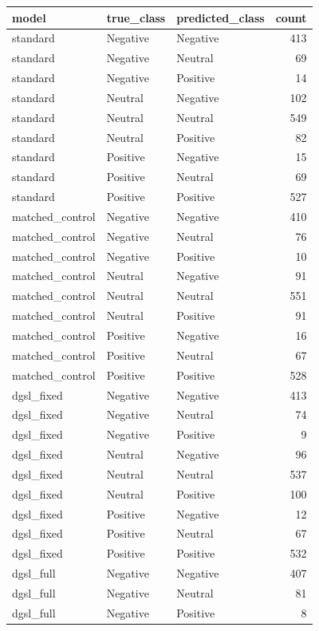 \begin{tabular}{lllr}
\toprule
model & true\_class & predicted\_class & count \\
\midrule
standard & Negative & Negative & 413 \\
standard & Negative & Neutral & 69 \\
standard & Negative & Positive & 14 \\
standard & Neutral & Negative & 102 \\
standard & Neutral & Neutral & 549 \\
standard & Neutral & Positive & 82 \\
standard & Positive & Negative & 15 \\
standard & Positive & Neutral & 69 \\
standard & Positive & Positive & 527 \\
matched\_control & Negative & Negative & 410 \\
matched\_control & Negative & Neutral & 76 \\
matched\_control & Negative & Positive & 10 \\
matched\_control & Neutral & Negative & 91 \\
matched\_control & Neutral & Neutral & 551 \\
matched\_control & Neutral & Positive & 91 \\
matched\_control & Positive & Negative & 16 \\
matched\_control & Positive & Neutral & 67 \\
matched\_control & Positive & Positive & 528 \\
dgsl\_fixed & Negative & Negative & 413 \\
dgsl\_fixed & Negative & Neutral & 74 \\
dgsl\_fixed & Negative & Positive & 9 \\
dgsl\_fixed & Neutral & Negative & 96 \\
dgsl\_fixed & Neutral & Neutral & 537 \\
dgsl\_fixed & Neutral & Positive & 100 \\
dgsl\_fixed & Positive & Negative & 12 \\
dgsl\_fixed & Positive & Neutral & 67 \\
dgsl\_fixed & Positive & Positive & 532 \\
dgsl\_full & Negative & Negative & 407 \\
dgsl\_full & Negative & Neutral & 81 \\
dgsl\_full & Negative & Positive & 8 \\

\end{tabular}
